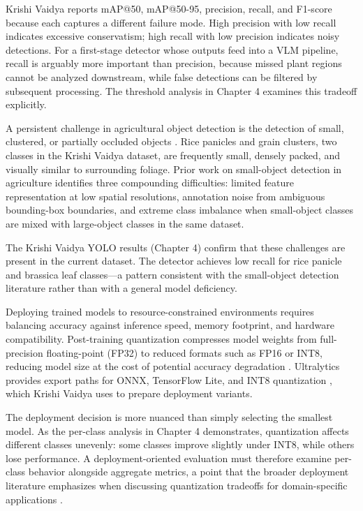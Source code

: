 Krishi Vaidya reports mAP@50, mAP@50-95, precision, recall, and F1-score because each captures
a different failure mode. High precision with low recall indicates excessive conservatism;
high recall with low precision indicates noisy detections. For a first-stage detector whose
outputs feed into a VLM pipeline, recall is arguably more important than precision, because
missed plant regions cannot be analyzed downstream, while false detections can be filtered by
subsequent processing. The threshold analysis in Chapter 4 examines this tradeoff explicitly.


A persistent challenge in agricultural object detection is the detection of small, clustered,
or partially occluded objects \parencite{zhengSmallObjDetAgri2023}. Rice panicles and grain
clusters, two classes in the Krishi Vaidya dataset, are frequently small, densely packed, and
visually similar to surrounding foliage. Prior work on small-object detection in agriculture
identifies three compounding difficulties: limited feature representation at low spatial
resolutions, annotation noise from ambiguous bounding-box boundaries, and extreme class
imbalance when small-object classes are mixed with large-object classes in the same dataset.

The Krishi Vaidya YOLO results (Chapter 4) confirm that these challenges are present in the
current dataset. The detector achieves low recall for rice panicle and brassica leaf classes---a
pattern consistent with the small-object detection literature rather than with a general model
deficiency.


Deploying trained models to resource-constrained environments requires balancing accuracy
against inference speed, memory footprint, and hardware compatibility. Post-training quantization
compresses model weights from full-precision floating-point (FP32) to reduced formats such as
FP16 or INT8, reducing model size at the cost of potential accuracy degradation
\parencite{garg2022quantizationSurvey}. Ultralytics provides export paths for ONNX, TensorFlow
Lite, and INT8 quantization \parencite{ultralyticsExport}, which Krishi Vaidya uses to prepare
deployment variants.

The deployment decision is more nuanced than simply selecting the smallest model. As the
per-class analysis in Chapter 4 demonstrates, quantization affects different classes unevenly:
some classes improve slightly under INT8, while others lose performance. A deployment-oriented
evaluation must therefore examine per-class behavior alongside aggregate metrics, a point
that the broader deployment literature emphasizes when discussing quantization tradeoffs for
domain-specific applications \parencite{paleyes2022MLSystemsChallenges}.

